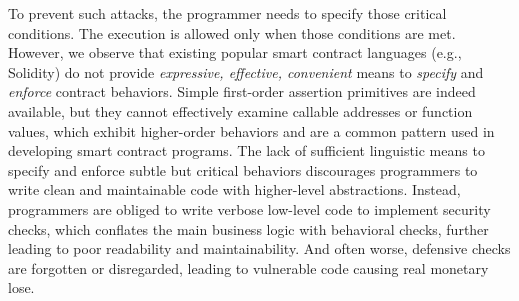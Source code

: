 

To prevent such attacks, the programmer needs to specify those critical
conditions. The execution is allowed only when those conditions are met.
However, we observe that existing popular smart contract languages (e.g.,
Solidity) do not provide \emph{expressive, effective, convenient} means to
\emph{specify} and \emph{enforce} contract behaviors.
Simple first-order assertion primitives are indeed available, but they cannot
effectively examine callable addresses or function values,
which exhibit
higher-order behaviors and are a common pattern used in developing smart contract
programs.
The lack of sufficient linguistic means to specify and enforce subtle but
critical behaviors discourages programmers to write clean and maintainable
code with higher-level abstractions.
Instead, programmers are obliged to write verbose low-level code
to implement security checks, which conflates the main business logic with
behavioral checks, further leading to poor readability and maintainability.
And often worse, defensive checks are forgotten or disregarded, leading to
vulnerable code causing real monetary lose.


